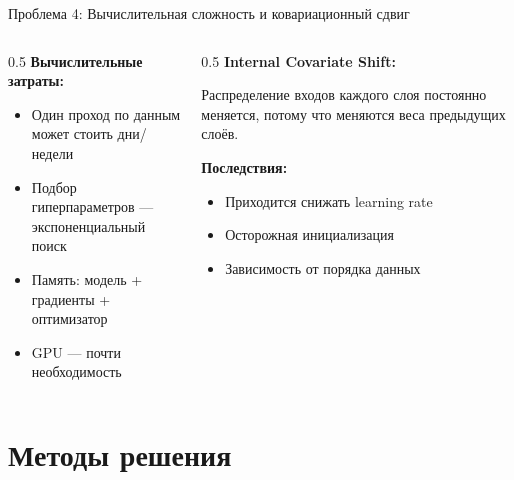 \documentclass[aspectratio=169, 9pt]{beamer}
\begin{document}
\begin{frame}{Проблема 4: Вычислительная сложность и ковариационный сдвиг}
  \begin{columns}[T]
    \begin{column}{0.5\textwidth}
      \textbf{Вычислительные затраты:}
      \begin{itemize}
        \item Один проход по данным может стоить дни/недели
        \item Подбор гиперпараметров — экспоненциальный поиск
        \item Память: модель + градиенты + оптимизатор
        \item GPU — почти необходимость
      \end{itemize}
    \end{column}
    \begin{column}{0.5\textwidth}
      \textbf{Internal Covariate Shift:}
      
      Распределение входов каждого слоя постоянно меняется, потому что меняются веса предыдущих слоёв.
      
      \vspace{0.3em}
      \textbf{Последствия:}
      \begin{itemize}
        \item Приходится снижать learning rate
        \item Осторожная инициализация
        \item Зависимость от порядка данных
      \end{itemize}
    \end{column}
  \end{columns}
\end{frame}

\section{Методы решения}
\end{document}
